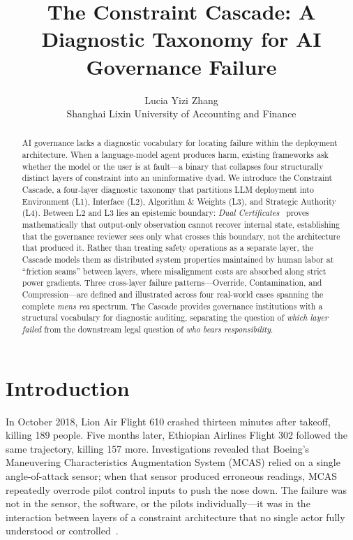 \documentclass[11pt]{article}
\title{The Constraint Cascade: A Diagnostic Taxonomy for AI Governance Failure}
\author{Lucia Yizi Zhang\\Shanghai Lixin University of Accounting and Finance}
\date{}
\begin{document}
\begin{abstract}
AI governance lacks a diagnostic vocabulary for locating failure within the deployment architecture. When a language-model agent produces harm, existing frameworks ask whether the model or the user is at fault---a binary that collapses four structurally distinct layers of constraint into an uninformative dyad. We introduce the Constraint Cascade, a four-layer diagnostic taxonomy that partitions LLM deployment into Environment (L1), Interface (L2), Algorithm \& Weights (L3), and Strategic Authority (L4). Between L2 and L3 lies an epistemic boundary: \textit{Dual Certificates}~\cite{anon2026dual} proves mathematically that output-only observation cannot recover internal state, establishing that the governance reviewer sees only what crosses this boundary, not the architecture that produced it. Rather than treating safety operations as a separate layer, the Cascade models them as distributed system properties maintained by human labor at ``friction seams'' between layers, where misalignment costs are absorbed along strict power gradients. Three cross-layer failure patterns---Override, Contamination, and Compression---are defined and illustrated across four real-world cases spanning the complete \textit{mens rea} spectrum. The Cascade provides governance institutions with a structural vocabulary for diagnostic auditing, separating the question of \textit{which layer failed} from the downstream legal question of \textit{who bears responsibility}.
\end{abstract}

\maketitle

\section{Introduction}

In October 2018, Lion Air Flight 610 crashed thirteen minutes after takeoff, killing 189 people. Five months later, Ethiopian Airlines Flight 302 followed the same trajectory, killing 157 more. Investigations revealed that Boeing's Maneuvering Characteristics Augmentation System (MCAS) relied on a single angle-of-attack sensor; when that sensor produced erroneous readings, MCAS repeatedly overrode pilot control inputs to push the nose down. The failure was not in the sensor, the software, or the pilots individually---it was in the interaction between layers of a constraint architecture that no single actor fully understood or controlled~\cite{jatr2019737max}.
\end{document}
